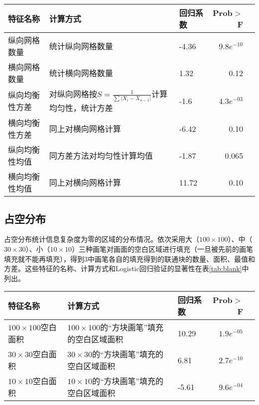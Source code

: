 \begin{table}[H]
  \centering
  \small
  \begin{tabular}{lllrr}
    \hline
     特征名称 & 计算方式 & 回归系数 & Prob$>$F \\
    \hline
    纵向网格数量 & 统计纵向网格数量 & -4.36 & $9.8e^{-10}$\\
    横向网格数量 & 统计横向网格数量 & 1.32 & 0.12\\ %
    纵向均衡性方差 & 对纵向网格按$S = \frac{1}{\sum | X_i - X_{n-1}|}$计算均匀性，统计方差 & -1.6 & $4.3e^{-03}$\\
    横向均衡性方差 & 同上对横向网格计算 & -6.42 & 0.10\\
    纵向均衡性均值 & 同方差方法对均匀性计算均值 & -1.87 & 0.065\\
    横向均衡性均值 & 同上对横向网格计算 & 11.72 & 0.10\\
    \hline
  \end{tabular}
\end{table}

\subsection{占空分布}
占空分布统计信息复杂度为零的区域的分布情况。依次采用大（$100\times100$）、中（$30\times30$）、小（$10\times10$）三种画笔对画面的空白区域进行填充（一旦被先前的画笔填充就不能再填充），得到3中画笔各自的填充得到的联通块的数量、面积、最值和方差。这些特征的名称、计算方式和Logistic回归验证的显著性在表\ref{tab:blank}中列出。

\begin{table}[H]
  \centering
  \small
  \begin{tabular}{lllrr}
    \hline
     特征名称 & 计算方式 & 回归系数 & Prob$>$F \\
    \hline
    $100\times100$空白面积 & $100\times100$的“方块画笔”填充的空白区域面积 & 10.29 & $1.9e^{-05}$\\
    $30\times30$空白面积 & $30\times30$的“方块画笔”填充的空白区域面积 & 6.81 & $2.7e^{-10}$\\
    $10\times10$空白面积 & $10\times10$的“方块画笔”填充的空白区域面积 & -5.61 & $9.6e^{-04}$\\
    \hline
  \end{tabular}
\end{table}

